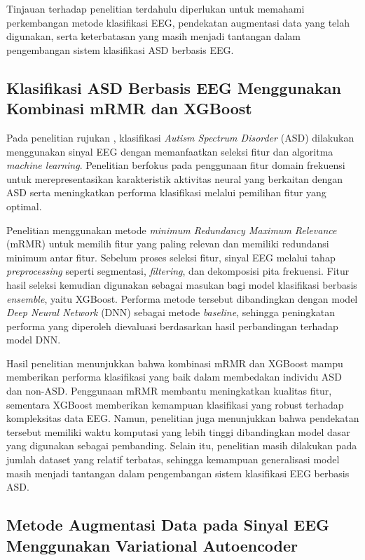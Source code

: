 Tinjauan terhadap penelitian terdahulu diperlukan untuk memahami perkembangan metode klasifikasi EEG, pendekatan augmentasi data yang telah digunakan, serta keterbatasan yang masih menjadi tantangan dalam pengembangan sistem klasifikasi ASD berbasis EEG.

\subsection{Klasifikasi ASD Berbasis EEG Menggunakan Kombinasi mRMR dan XGBoost}
\label{Klasifikasi ASD Berbasis EEG Menggunakan mRMR dan XGBoost}

Pada penelitian rujukan \cite{paper_ref}, klasifikasi \textit{Autism Spectrum Disorder} (ASD) dilakukan menggunakan sinyal EEG dengan memanfaatkan seleksi fitur dan algoritma \textit{machine learning}. Penelitian berfokus pada penggunaan fitur domain frekuensi untuk merepresentasikan karakteristik aktivitas neural yang berkaitan dengan ASD serta meningkatkan performa klasifikasi melalui pemilihan fitur yang optimal.

Penelitian menggunakan metode \textit{minimum Redundancy Maximum Relevance} (mRMR) untuk memilih fitur yang paling relevan dan memiliki redundansi minimum antar fitur. Sebelum proses seleksi fitur, sinyal EEG melalui tahap \textit{preprocessing} seperti segmentasi, \textit{filtering}, dan dekomposisi pita frekuensi. Fitur hasil seleksi kemudian digunakan sebagai masukan bagi model klasifikasi berbasis \textit{ensemble}, yaitu XGBoost. Performa metode tersebut dibandingkan dengan model \textit{Deep Neural Network} (DNN) sebagai metode \textit{baseline}, sehingga peningkatan performa yang diperoleh dievaluasi berdasarkan hasil perbandingan terhadap model DNN.

Hasil penelitian menunjukkan bahwa kombinasi mRMR dan XGBoost mampu memberikan performa klasifikasi yang baik dalam membedakan individu ASD dan non-ASD. Penggunaan mRMR membantu meningkatkan kualitas fitur, sementara XGBoost memberikan kemampuan klasifikasi yang robust terhadap kompleksitas data EEG. Namun, penelitian juga menunjukkan bahwa pendekatan tersebut memiliki waktu komputasi yang lebih tinggi dibandingkan model dasar yang digunakan sebagai pembanding. Selain itu, penelitian masih dilakukan pada jumlah dataset yang relatif terbatas, sehingga kemampuan generalisasi model masih menjadi tantangan dalam pengembangan sistem klasifikasi EEG berbasis ASD. 

\subsection{Metode Augmentasi Data pada Sinyal EEG Menggunakan Variational Autoencoder}
\label{Augmentasi Data pada Sinyal EEG Menggunakan Variational Autoencoder}

